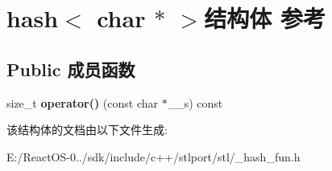 \hypertarget{structhash_3_01char_01_5_01_4}{}\section{hash$<$ char $\ast$ $>$结构体 参考}
\label{structhash_3_01char_01_5_01_4}
\subsection*{Public 成员函数}
\begin{DoxyCompactItemize}
\item 
\mbox{\label{structhash_3_01char_01_5_01_4_a273f60d0233e87fdb194ceb897f2f98a}} 
size\+\_\+t {\bfseries operator()} (const char $\ast$\+\_\+\+\_\+s) const
\end{DoxyCompactItemize}


该结构体的文档由以下文件生成\+:\begin{DoxyCompactItemize}
\item 
E\+:/\+React\+O\+S-\/0../sdk/include/c++/stlport/stl/\+\_\+hash\+\_\+fun.\+h\end{DoxyCompactItemize}
